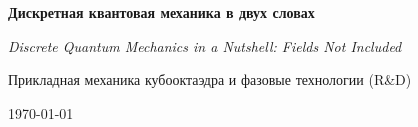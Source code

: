 \begin{titlepage}
  \centering
  \vspace*{2cm}
  {\LARGE\bfseries Дискретная квантовая механика в двух словах\par}
  \vspace{0.35cm}
  {\normalsize\itshape Discrete Quantum Mechanics in a Nutshell: Fields Not Included\par}
  \vspace{0.8cm}
  {\Large Прикладная механика кубооктаэдра и фазовые технологии (R\&D)\par}
  \vfill
  {\large \today\par}
\end{titlepage}
\clearpage

\clearpage
\tableofcontents
\clearpage
